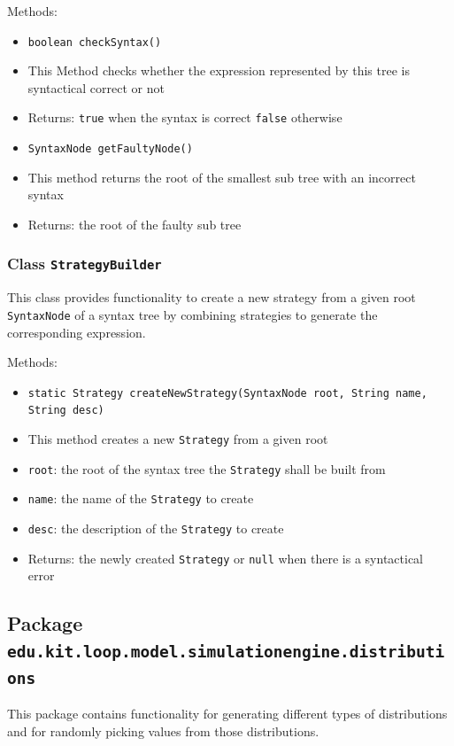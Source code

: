 \documentclass[parskip=full,11pt]{scrartcl}
\begin{document}
Methods:
\begin{itemize} \itemsep -10pt
	\item \texttt{boolean checkSyntax()}
	\item[] This Method checks whether the expression represented by this tree is syntactical correct or not
	\item[] Returns: \texttt{true} when the syntax is correct \texttt{false} otherwise

	\item \texttt{SyntaxNode getFaultyNode()}
	\item[] This method returns the root of the smallest sub tree with an incorrect syntax
	\item[] Returns: the root of the faulty sub tree
\end{itemize}

\subsubsection{Class \texttt{StrategyBuilder}}

This class provides functionality to create a new strategy from a given root \texttt{SyntaxNode} of a syntax tree by combining strategies to generate the corresponding expression.

Methods:
\begin{itemize} \itemsep -10pt
	\item \texttt{static Strategy createNewStrategy(SyntaxNode root, String name, String desc)}
	\item[] This method creates a new \texttt{Strategy} from a given root
	\item[] \texttt{root}: the root of the syntax tree the \texttt{Strategy} shall be built from
	\item[] \texttt{name}: the name of the \texttt{Strategy} to create
	\item[] \texttt{desc}: the description of the \texttt{Strategy} to create
	\item[] Returns: the newly created \texttt{Strategy} or \texttt{null} when there is a syntactical error
\end{itemize}


\subsection{Package \texttt{edu.kit.loop.model.simulationengine.distributions}}

This package contains functionality for generating different types of distributions and for randomly picking values from those distributions.
\end{document}
